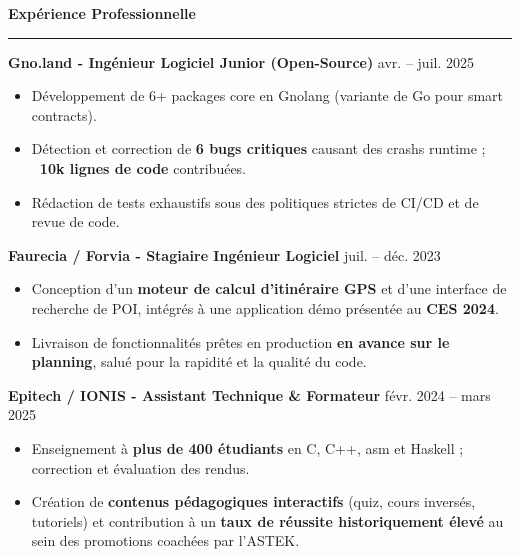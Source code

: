 \documentclass[9pt]{extarticle}
\begin{document}
\par\vspace{5pt}

{\large\bfseries Expérience Professionnelle}
\par\vspace{-8pt}
\rule{\linewidth}{0.4pt}
\par\vspace{5pt}

{\bfseries Gno.land - Ingénieur Logiciel Junior (Open-Source)} \hfill avr. -- juil. 2025
\begin{itemize}[noitemsep, topsep=0pt]
	\item Développement de 6+ packages core en Gnolang (variante de Go pour smart contracts).
	\item Détection et correction de {\bfseries 6 bugs critiques} causant des crashs runtime ; {\bfseries ~10k lignes de code} contribuées.
	\item Rédaction de tests exhaustifs sous des politiques strictes de CI/CD et de revue de code.
\end{itemize}

\par\vspace{5pt}

{\bfseries Faurecia / Forvia - Stagiaire Ingénieur Logiciel} \hfill juil. -- déc. 2023
\begin{itemize}[noitemsep, topsep=0pt]
	\item Conception d'un {\bfseries moteur de calcul d'itinéraire GPS} et d'une interface de recherche de POI, intégrés à une application démo présentée au {\bfseries CES 2024}.
	\item Livraison de fonctionnalités prêtes en production {\bfseries en avance sur le planning}, salué pour la rapidité et la qualité du code.
\end{itemize}

\par\vspace{5pt}

{\bfseries Epitech / IONIS - Assistant Technique \& Formateur} \hfill févr. 2024 -- mars 2025
\begin{itemize}[noitemsep, topsep=0pt]
	\item Enseignement à {\bfseries plus de 400 étudiants} en C, C++, asm et Haskell ; correction et évaluation des rendus.
	\item Création de {\bfseries contenus pédagogiques interactifs} (quiz, cours inversés, tutoriels) et contribution à un {\bfseries taux de réussite historiquement élevé} au sein des promotions coachées par l'ASTEK.
\end{itemize}
\end{document}

